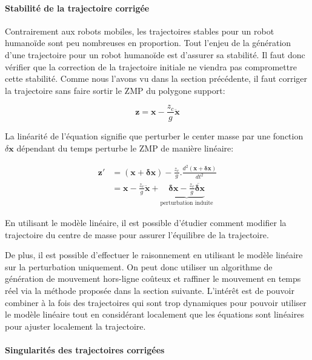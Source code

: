\paragraph{Stabilité de la trajectoire corrigée}


Contrairement aux robots mobiles, les trajectoires stables pour un
robot humanoïde sont peu nombreuses en proportion. Tout l'enjeu de la
génération d'une trajectoire pour un robot humanoïde est d'assurer sa
stabilité. Il faut donc vérifier que la correction de la trajectoire
initiale ne viendra pas compromettre cette stabilité. Comme nous
l'avons vu dans la section précédente, il faut corriger la trajectoire
sans faire sortir le ZMP du polygone
support:

\begin{equation} \label{eq:zmp2}
  \mathbf{z} = \mathbf{x}  - \frac{z_c}{g} \ddot{\mathbf{x}}
\end{equation}

La linéarité de l'équation signifie que perturber le center masse par
une fonction \mbox{$\delta \mathbf{x}$} dépendant du temps perturbe le
ZMP de manière linéaire:

\begin{equation} \label{eq:zmpperturbation}
\begin{split}
  \mathbf{z'} &= (\mathbf{x} + \mathbf{\delta x}) - \frac{z_c}{g} .
  \frac{d^2 (\mathbf{x} + \mathbf{\delta x})}{d t^2}\\
  &= \mathbf{x} - \frac{z_c}{g} \ddot{\mathbf{x}} +
  \underbrace{\mathbf{\delta x} - \frac{z_c}{g} \ddot{\mathbf{\delta
        x}}}_{\text{perturbation induite}}
\end{split}
\end{equation}

En utilisant le modèle linéaire, il est possible d'étudier comment
modifier la trajectoire du centre de masse pour assurer l'équilibre de
la trajectoire.

De plus, il est possible d'effectuer le raisonnement en utilisant le
modèle linéaire sur la perturbation uniquement. On peut donc utiliser
un algorithme de génération de mouvement hors-ligne coûteux et
raffiner le mouvement en temps réel via la méthode proposée dans la
section suivante. L'intérêt est de pouvoir combiner à la fois des
trajectoires qui sont trop dynamiques pour pouvoir utiliser le modèle
linéaire tout en considérant localement que les équations sont
linéaires pour ajuster localement la trajectoire.


\paragraph{Singularités des trajectoires corrigées}

